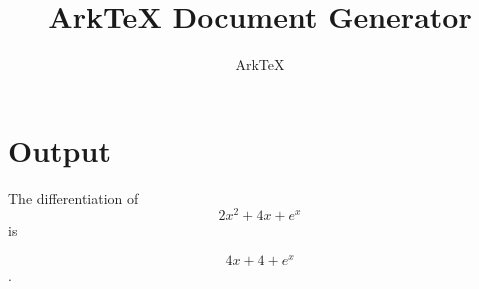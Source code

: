 \documentclass[dvips, 12pt, twoside]{article}
\begin{document}
\title{ArkTeX Document Generator}
\author{ArkTeX}
\maketitle

\medskip

\section*{Output}
\begin{LARGE}
 The differentiation of $$2x^2 + 4x + e^{x} $$ is 

$$ 4x + 4 + e^{x} $$ .
\end{LARGE}
\end{document}
